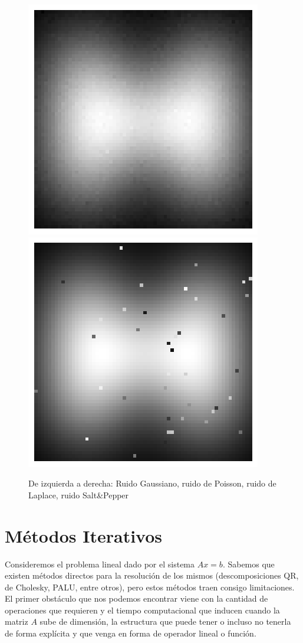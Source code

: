 \documentclass[12pt, oneside]{book}
\begin{document}
\begin{figure}[H]
		\includegraphics[scale=0.3]{Imagenes/H_Laplace.png}
		\includegraphics[scale=0.3]{Imagenes/H_SyP.png}
		\caption{De izquierda a derecha: Ruido Gaussiano, ruido de Poisson, ruido de Laplace, ruido Salt\&Pepper\\}
	\end{figure}
	
\section{Métodos Iterativos}

Consideremos el problema lineal dado por el sistema $Ax = b$. Sabemos que existen métodos directos para la resolución de los mismos (descomposiciones QR, de Cholesky, PALU, entre otros), pero estos métodos traen consigo limitaciones. El primer obstáculo que nos podemos encontrar viene con la cantidad de operaciones que requieren y el tiempo computacional que inducen cuando la matriz $A$ sube de dimensión, la estructura que puede tener o incluso no tenerla de forma explícita y que venga en forma de operador lineal o función.
\end{document}
